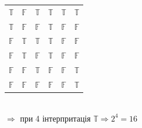 \documentclass[a4paper,12pt]{article}
\begin{document}
\begin{enumerate}
\begin{table}[htp]
\begin{tabular}{|c|c|c|c|c|c|}
$\mathbb{T}$ & $\mathbb{F}$ & $\mathbb{T}$ & $\mathbb{T}$ & $\mathbb{T}$ & \cellcolor[HTML]{9AFF99}$\mathbb{T}$ \\
$\mathbb{T}$ & $\mathbb{F}$ & $\mathbb{F}$ & $\mathbb{T}$ & $\mathbb{F}$ & $\mathbb{F}$                         \\
$\mathbb{F}$ & $\mathbb{T}$ & $\mathbb{T}$ & $\mathbb{T}$ & $\mathbb{F}$ & $\mathbb{F}$                         \\
$\mathbb{F}$ & $\mathbb{T}$ & $\mathbb{F}$ & $\mathbb{T}$ & $\mathbb{F}$ & $\mathbb{F}$                         \\
$\mathbb{F}$ & $\mathbb{F}$ & $\mathbb{T}$ & $\mathbb{F}$ & $\mathbb{F}$ & \cellcolor[HTML]{9AFF99}$\mathbb{T}$ \\
$\mathbb{F}$ & $\mathbb{F}$ & $\mathbb{F}$ & $\mathbb{F}$ & $\mathbb{F}$ & \cellcolor[HTML]{9AFF99}$\mathbb{T}$ \\\hline
\end{tabular}
\end{table}\\
$\Rightarrow$ при 4 інтерпритація $
\mathbb{T}\Rightarrow 2^4=16$


\end{enumerate}
\end{document}
